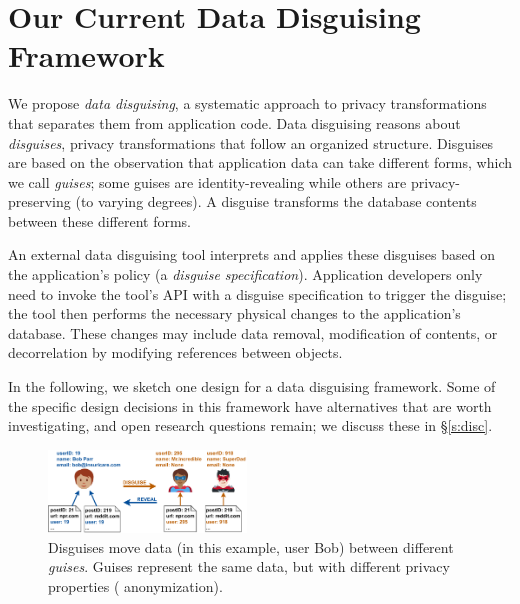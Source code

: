 \section{Our Current Data Disguising Framework}

We propose \emph{data disguising}, a systematic approach to privacy
transformations that separates them from application code.
%
Data disguising reasons about \emph{disguises}, privacy transformations that
follow an organized structure.
%
Disguises are based on the observation that application data can take
different forms, which we call \emph{guises}; some guises are identity-revealing while others are
privacy-preserving (to varying degrees).
%
%
A disguise transforms the database contents between these different forms.
%
%

%
An external data disguising tool interprets and applies these disguises
based on the application's policy (a \emph{disguise specification}).
%
Application developers only need to invoke the tool's API with a disguise specification to trigger
the disguise; the tool then performs the necessary physical changes to the application's
database.
%
These changes may include data removal, modification of contents, or decorrelation by modifying
references between objects.
%

%
In the following, we sketch one design for a data disguising framework.
%
Some of the specific design decisions in this framework have alternatives that are worth
investigating, and open research questions remain; we discuss these in \S\ref{s:disc}.

\begin{figure}[t]
    \centering
    \includegraphics[width=0.47\textwidth]{img/disguises_new}

    \caption{Disguises move data (in this example, user Bob) 
             between different \emph{guises}. Guises represent the
             same data, but with different privacy properties (\eg
             anonymization).}
    \label{fig:example}
\end{figure}


